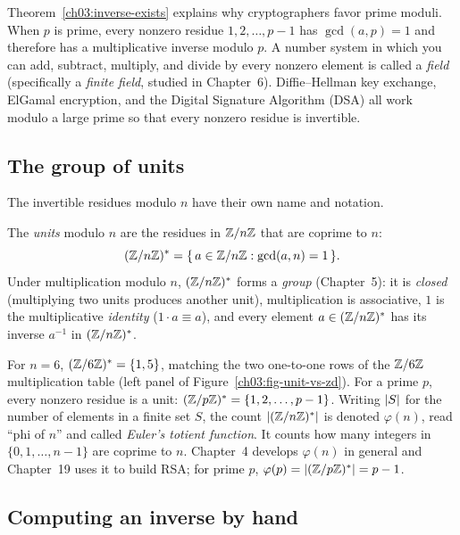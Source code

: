 \begin{whybox}
Theorem~\ref{ch03:inverse-exists} explains why cryptographers favor prime moduli. When $p$ is prime, every nonzero residue $1, 2, \dots, p-1$ has $\gcd(a, p) = 1$ and therefore has a multiplicative inverse modulo $p$. A number system in which you can add, subtract, multiply, and divide by every nonzero element is called a \emph{field} (specifically a \emph{finite field}, studied in Chapter~6). Diffie--Hellman key exchange, ElGamal encryption, and the Digital Signature Algorithm (DSA) all work modulo a large prime so that every nonzero residue is invertible.
\end{whybox}

\subsection{The group of units}

The invertible residues modulo $n$ have their own name and notation.

\begin{definition}
\label{ch03:units}
The \emph{units} modulo $n$ are the residues in $\mathbb{Z}/n\mathbb{Z}$ that are coprime to $n$:
\[
  (\mathbb{Z}/n\mathbb{Z})^{*} = \{\, a \in \mathbb{Z}/n\mathbb{Z} : \gcd(a,n) = 1 \,\}.
\]
Under multiplication modulo $n$, $(\mathbb{Z}/n\mathbb{Z})^{*}$ forms a \emph{group} (Chapter~5): it is \emph{closed} (multiplying two units produces another unit), multiplication is associative, $1$ is the multiplicative \emph{identity} ($1 \cdot a \equiv a$), and every element $a \in (\mathbb{Z}/n\mathbb{Z})^{*}$ has its inverse $a^{-1}$ in $(\mathbb{Z}/n\mathbb{Z})^{*}$.
\end{definition}

For $n = 6$, $(\mathbb{Z}/6\mathbb{Z})^{*} = \{1, 5\}$, matching the two one-to-one rows of the $\mathbb{Z}/6\mathbb{Z}$ multiplication table (left panel of Figure~\ref{ch03:fig-unit-vs-zd}). For a prime $p$, every nonzero residue is a unit: $(\mathbb{Z}/p\mathbb{Z})^{*} = \{1, 2, \dots, p-1\}$. Writing $\lvert S\rvert$ for the number of elements in a finite set $S$, the count $\lvert(\mathbb{Z}/n\mathbb{Z})^{*}\rvert$ is denoted $\varphi(n)$, read ``phi of $n$'' and called \emph{Euler's totient function}. It counts how many integers in $\{0, 1, \dots, n-1\}$ are coprime to $n$. Chapter~4 develops $\varphi(n)$ in general and Chapter~19 uses it to build RSA; for prime $p$, $\varphi(p) = \lvert(\mathbb{Z}/p\mathbb{Z})^{*}\rvert = p - 1$.

\subsection{Computing an inverse by hand}

